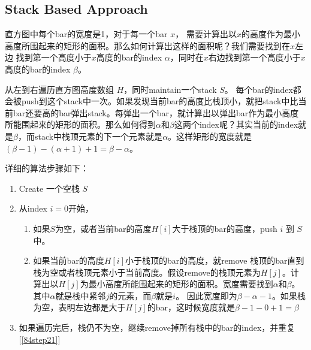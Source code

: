 \subsection{Stack Based Approach}
\begin{CJK*}{UTF8}{gbsn}
直方图中每个bar的宽度是1，对于每一个bar $x$， 需要计算出以$x$的高度作为最小高度所围起来的矩形的面积。那么如何计算出这样的面积呢？我们需要找到在$x$左边 找到第一个高度小于$x$高度的bar的index $\alpha$，同时在$x$右边找到第一个高度小于$x$高度的bar的index $\beta$。
\par
从左到右遍历直方图高度数组 $H$，同时maintain一个stack $S$。 每个bar的index都会被push到这个stack中一次。如果发现当前bar的高度比栈顶小，就把stack中比当前bar还要高的bar弹出stack。每弹出一个bar，就计算出以弹出bar作为最小高度所能围起来的矩形的面积。那么如何得到$\alpha$和$\beta$这两个index呢？其实当前的index就是$\beta$，而stack中栈顶元素的下一个元素就是$\alpha$。这样矩形的宽度就是$(\beta-1) - (\alpha+1) + 1 = \beta-\alpha$。
\par
详细的算法步骤如下：
\begin{enumerate}
\item Create 一个空栈 $S$
\item 从index $i=0$开始，
\begin{enumerate}
\item 如果$S$为空，或者当前bar的高度$H[i]$大于栈顶的bar的高度，push $i$ 到 $S$中。
\item 如果当前bar的高度$H[i]$小于栈顶的bar的高度，就remove 栈顶的bar直到栈为空或者栈顶元素小于当前高度。假设remove的栈顶元素为$H[j]$。计算出以$H[j]$为最小高度所能围起来的矩形的面积。宽度需要找到$\alpha$和$\beta$。其中$\alpha$就是栈中紧邻$j$的元素，而$\beta$就是$i$。 因此宽度即为$\beta-\alpha-1$。如果栈为空，表明左边都是大于$H[j]$的bar，这时候宽度就是$\beta-1-0+1 = \beta$\label{84step21}
\end{enumerate}
\item 如果遍历完后，栈仍不为空，继续remove掉所有栈中的bar的index，并重复[\ref{84step21}]
\end{enumerate}
\end{CJK*}

